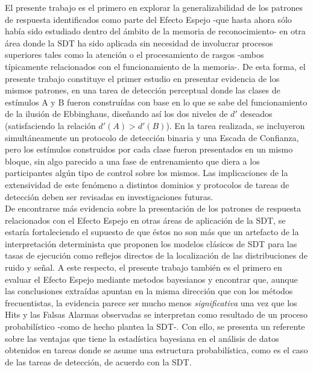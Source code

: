 El presente trabajo es el primero en explorar la generalizabilidad de los patrones de respuesta identificados como parte del Efecto Espejo -que hasta ahora sólo había sido estudiado dentro del ámbito de la memoria de reconocimiento- en otra área donde la SDT ha sido aplicada sin necesidad de involucrar procesos superiores tales como la atención o el procesamiento de rasgos -ambos típicamente relacionados con el funcionamiento de la memoria-. De esta forma, el presente trabajo constituye el primer estudio en presentar evidencia de los mismos patrones, en una tarea de detección perceptual donde las clases de estímulos A y B fueron construídas con base en lo que se sabe del funcionamiento de la ilusión de Ebbinghaus, diseñando así los dos niveles de $d'$ deseados (satisfaciendo la relación $d'(A)>d'(B)$). En la tarea realizada, se incluyeron simultáneamente un protocolo de detección binaria y una Escada de Confianza, pero los estímulos construidos por cada clase fueron presentados en un mismo bloque, sin algo parecido a una fase de entrenamiento que diera a los participantes algún tipo de control sobre los mismos. Las implicaciones de la extensividad de este fenómeno a distintos dominios y protocolos de tareas de detección deben ser revisadas en investigaciones futuras.\\

De encontrarse más evidencia sobre la presentación de los patrones de respuesta relacionados con el Efecto Espejo en otras áreas de aplicación de la SDT, se estaría fortaleciendo el supuesto de que éstos no son más que un artefacto de la interpretación determinista que proponen los modelos clásicos de SDT para las tasas de ejecución como reflejos directos de la localización de las distribuciones de ruido y señal. A este respecto, el presente trabajo también es el primero en evaluar el Efecto Espejo mediante metodos bayesianos y encontrar que, aunque las conclusiones extraídas apuntan en la misma dirección que con los métodos frecuentistas, la evidencia parece ser mucho menos \textit{significativa} una vez que los Hits y las Falsas Alarmas observadas se interpretan como resultado de un proceso probabilístico -como de hecho plantea la SDT-. Con ello, se presenta un referente sobre las ventajas que tiene la estadística bayesiana en el análisis de datos obtenidos en tareas donde se asume una estructura probabilística, como es el caso de las tareas de detección, de acuerdo con la SDT. \\









